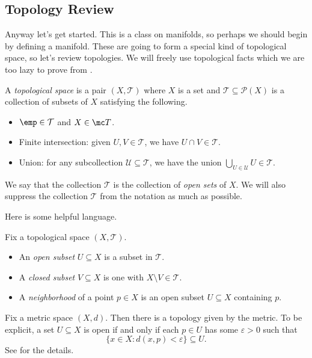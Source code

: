 \documentclass[../notes.tex]{subfiles}
\begin{document}
\subsection{Topology Review}
Anyway let's get started. This is a class on manifolds, so perhaps we should begin by defining a manifold. These are going to form a special kind of topological space, so let's review topologies. We will freely use topological facts which we are too lazy to prove from \cite{elber-top}.
\begin{definition}
	A \textit{topological space} is a pair $(X,\mathcal T)$ where $X$ is a set and $\mathcal T\subseteq\mathcal P(X)$ is a collection of subsets of $X$ satisfying the following.
	\begin{itemize}
		\item $\emp\in\mathcal T$ and $X\in\mc T$.
		\item Finite intersection: given $U,V\in\mathcal T$, we have $U\cap V\in\mathcal T$.
		\item Union: for any subcollection $\mathcal U\subseteq\mathcal T$, we have the union $\bigcup_{U\in\mathcal U}U\in\mathcal T$.
	\end{itemize}
	We say that the collection $\mathcal T$ is the collection of \textit{open sets} of $X$. We will also suppress the collection $\mathcal T$ from the notation as much as possible.
\end{definition}
Here is some helpful language.
\begin{defihelper}   
	Fix a topological space $(X,\mathcal T)$.
	\begin{itemize}
		\item An \textit{open subset} $U\subseteq X$ is a subset in $\mathcal T$.
		\item A \textit{closed subset} $V\subseteq X$ is one with $X\setminus V\in\mathcal T$.
		\item A \textit{neighborhood} of a point $p\in X$ is an open subset $U\subseteq X$ containing $p$.
	\end{itemize}
\end{defihelper}
\begin{example} \label{ex:metric-top}
	Fix a metric space $(X,d)$. Then there is a topology given by the metric. To be explicit, a set $U\subseteq X$ is open if and only if each $p\in U$ has some $\varepsilon>0$ such that
	\[\{x\in X:d(x,p)<\varepsilon\}\subseteq U.\]
	See \cite[Example~2.13]{elber-top} for the details.
\end{example}
\end{document}
